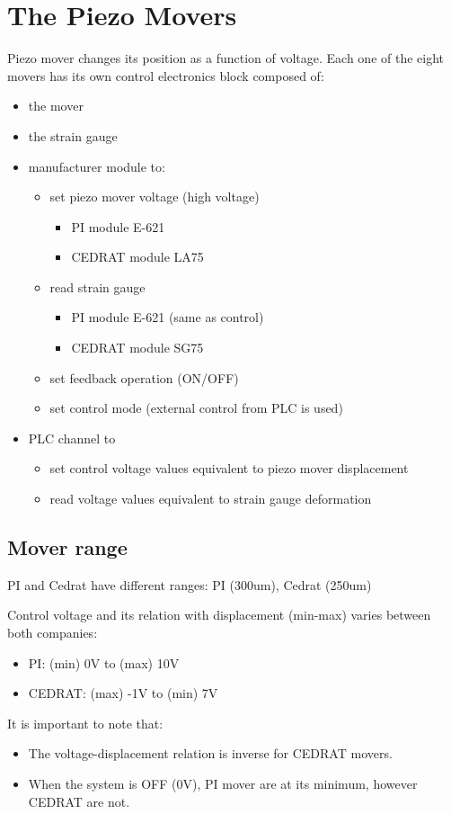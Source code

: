 \section{The Piezo Movers}
Piezo mover changes its position as a function of voltage. Each one of the eight movers has its own control electronics block composed of: 
\begin{itemize}
 \item the mover
\item the strain gauge
\item manufacturer module to:
\begin{itemize}
 \item set piezo mover voltage (high voltage)
 \begin{itemize}
\item PI module E-621
\item CEDRAT module LA75
\end{itemize}
\item read strain gauge
\begin{itemize}
\item PI module E-621 (same as control)
\item CEDRAT module SG75
\end{itemize}
\item set feedback operation (ON/OFF)
\item set control mode (external control from PLC is used)
\end{itemize}
\item PLC channel to
\begin{itemize}
\item set control voltage values equivalent to piezo mover displacement
\item read voltage values equivalent to strain gauge deformation
\end{itemize}
\end{itemize}

\subsection{Mover range}
PI and Cedrat have different ranges: PI (300um), Cedrat (250um)\par

Control voltage and its relation with displacement (min-max) varies between both companies:\par
\begin{itemize}
\item PI: 		(min)   0V   	to 	(max) 10V
\item CEDRAT: 	(max) -1V 	to	(min)    7V
\end{itemize}
It is important to note that:
\begin{itemize}
\item The voltage-displacement relation is inverse for CEDRAT movers.
\item When the system is OFF (0V), PI mover are at its minimum, however CEDRAT are not.
\end{itemize}

